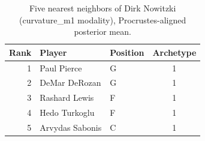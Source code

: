 \begin{table}[htbp]
  \centering\small
  \begin{tabular}{rllc}
    \toprule
    Rank & Player & Position & Archetype \\
    \midrule
    1 & Paul Pierce & G & 1 \\
    2 & DeMar DeRozan & G & 1 \\
    3 & Rashard Lewis & F & 1 \\
    4 & Hedo Turkoglu & F & 1 \\
    5 & Arvydas Sabonis & C & 1 \\
    \bottomrule
  \end{tabular}
  \caption{Five nearest neighbors of Dirk Nowitzki (curvature_m1 modality), Procrustes-aligned posterior mean.}
  \label{tab:Dirk_Nowitzki_neighbors_curvature_m1}
\end{table}

